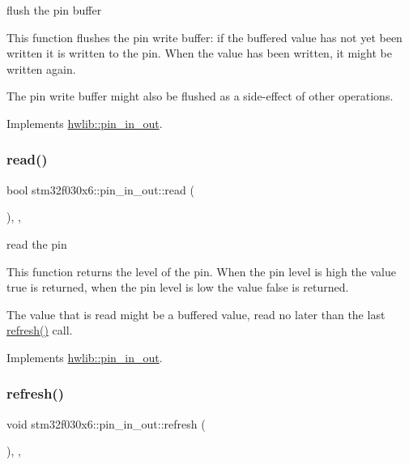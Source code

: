 flush the pin buffer

This function flushes the pin write buffer\+: if the buffered value has not yet been written it is written to the pin. When the value has been written, it might be written again.

The pin write buffer might also be flushed as a side-\/effect of other operations. 

Implements \hyperlink{classhwlib_1_1pin__in__out_a5207c9e30f0c88e4c052952397c2da88}{hwlib\+::pin\+\_\+in\+\_\+out}.

\mbox{\label{classstm32f030x6_1_1pin__in__out_a94c8a2495046a0240cf7bc42e870d289}} 
\subsubsection{\texorpdfstring{read()}{read()}}
{\footnotesize\ttfamily bool stm32f030x6\+::pin\+\_\+in\+\_\+out\+::read (\begin{DoxyParamCaption}{ }\end{DoxyParamCaption})\hspace{0.3cm}{\ttfamily [inline]}, {\ttfamily [override]}, {\ttfamily [virtual]}}

read the pin

This function returns the level of the pin. When the pin level is high the value true is returned, when the pin level is low the value false is returned.

The value that is read might be a buffered value, read no later than the last \hyperlink{classstm32f030x6_1_1pin__in__out_a5afd4fa1e88219976b7d4d5690edc0b1}{refresh()} call. 

Implements \hyperlink{classhwlib_1_1pin__in__out_a5caebc7ab9fe49b7e020b89f0a2cf892}{hwlib\+::pin\+\_\+in\+\_\+out}.

\mbox{\label{classstm32f030x6_1_1pin__in__out_a5afd4fa1e88219976b7d4d5690edc0b1}} 
\subsubsection{\texorpdfstring{refresh()}{refresh()}}
{\footnotesize\ttfamily void stm32f030x6\+::pin\+\_\+in\+\_\+out\+::refresh (\begin{DoxyParamCaption}{ }\end{DoxyParamCaption})\hspace{0.3cm}{\ttfamily [inline]}, {\ttfamily [override]}, {\ttfamily [virtual]}}

